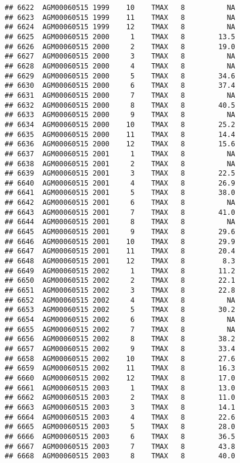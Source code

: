 \documentclass{article}\usepackage[]{graphicx}\usepackage[]{color}
\makeatletter
\newenvironment{kframe}{%
 \def\at@end@of@kframe{}%
 \ifinner\ifhmode%
  \def\at@end@of@kframe{\end{minipage}}%
  \begin{minipage}{\columnwidth}%
 \fi\fi%
 \def\FrameCommand##1{\hskip\@totalleftmargin \hskip-\fboxsep
 \colorbox{shadecolor}{##1}\hskip-\fboxsep
     \hskip-\linewidth \hskip-\@totalleftmargin \hskip\columnwidth}%
 \MakeFramed {\advance\hsize-\width
   \@totalleftmargin\z@ \linewidth\hsize
   \@setminipage}}%
 {\par\unskip\endMakeFramed%
 \at@end@of@kframe}
\newenvironment{knitrout}{}{} %
\makeatother
\begin{document}
\begin{knitrout}
\begin{kframe}
\begin{verbatim}
## 6622  AGM00060515 1999    10    TMAX   8          NA
## 6623  AGM00060515 1999    11    TMAX   8          NA
## 6624  AGM00060515 1999    12    TMAX   8          NA
## 6625  AGM00060515 2000     1    TMAX   8        13.5
## 6626  AGM00060515 2000     2    TMAX   8        19.0
## 6627  AGM00060515 2000     3    TMAX   8          NA
## 6628  AGM00060515 2000     4    TMAX   8          NA
## 6629  AGM00060515 2000     5    TMAX   8        34.6
## 6630  AGM00060515 2000     6    TMAX   8        37.4
## 6631  AGM00060515 2000     7    TMAX   8          NA
## 6632  AGM00060515 2000     8    TMAX   8        40.5
## 6633  AGM00060515 2000     9    TMAX   8          NA
## 6634  AGM00060515 2000    10    TMAX   8        25.2
## 6635  AGM00060515 2000    11    TMAX   8        14.4
## 6636  AGM00060515 2000    12    TMAX   8        15.6
## 6637  AGM00060515 2001     1    TMAX   8          NA
## 6638  AGM00060515 2001     2    TMAX   8          NA
## 6639  AGM00060515 2001     3    TMAX   8        22.5
## 6640  AGM00060515 2001     4    TMAX   8        26.9
## 6641  AGM00060515 2001     5    TMAX   8        38.0
## 6642  AGM00060515 2001     6    TMAX   8          NA
## 6643  AGM00060515 2001     7    TMAX   8        41.0
## 6644  AGM00060515 2001     8    TMAX   8          NA
## 6645  AGM00060515 2001     9    TMAX   8        29.6
## 6646  AGM00060515 2001    10    TMAX   8        29.9
## 6647  AGM00060515 2001    11    TMAX   8        20.4
## 6648  AGM00060515 2001    12    TMAX   8         8.3
## 6649  AGM00060515 2002     1    TMAX   8        11.2
## 6650  AGM00060515 2002     2    TMAX   8        22.1
## 6651  AGM00060515 2002     3    TMAX   8        22.8
## 6652  AGM00060515 2002     4    TMAX   8          NA
## 6653  AGM00060515 2002     5    TMAX   8        30.2
## 6654  AGM00060515 2002     6    TMAX   8          NA
## 6655  AGM00060515 2002     7    TMAX   8          NA
## 6656  AGM00060515 2002     8    TMAX   8        38.2
## 6657  AGM00060515 2002     9    TMAX   8        33.4
## 6658  AGM00060515 2002    10    TMAX   8        27.6
## 6659  AGM00060515 2002    11    TMAX   8        16.3
## 6660  AGM00060515 2002    12    TMAX   8        17.0
## 6661  AGM00060515 2003     1    TMAX   8        13.0
## 6662  AGM00060515 2003     2    TMAX   8        11.0
## 6663  AGM00060515 2003     3    TMAX   8        14.1
## 6664  AGM00060515 2003     4    TMAX   8        22.6
## 6665  AGM00060515 2003     5    TMAX   8        28.0
## 6666  AGM00060515 2003     6    TMAX   8        36.5
## 6667  AGM00060515 2003     7    TMAX   8        43.8
## 6668  AGM00060515 2003     8    TMAX   8        40.0

\end{verbatim}
\end{kframe}
\end{knitrout}
\end{document}
